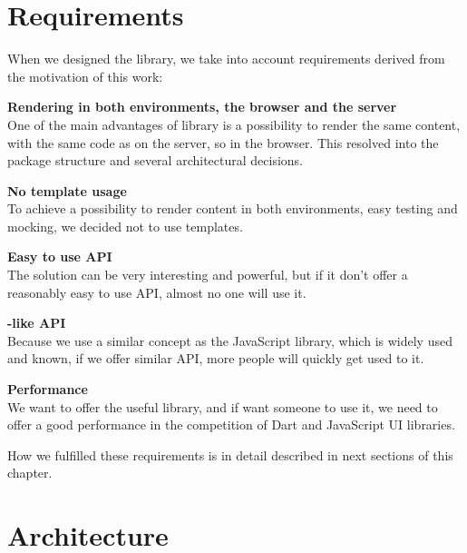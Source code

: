 \documentclass[oneside, 12pt]{book}
\begin{document}
\section{Requirements}\label{subsec:our-architecture-requirements}

  When we designed the \tiles library, we take into account requirements derived from the motivation of this work:

  \begin{description}
    \item{\textbf{Rendering in both environments, the browser and the server}} \hfill \\
      One of the main advantages of \tiles library is a possibility to render the same content, 
      with the same code as on the server, so in the browser.
      This resolved into the package structure and several architectural decisions.
      \begin{description}
        \item{\textbf{No template usage}} \hfill \\
          To achieve a possibility to render content in both environments, easy testing and mocking, 
          we decided not to use templates.
      \end{description}
    \item{\textbf{Easy to use API}} \hfill \\
      The solution can be very interesting and powerful, 
      but if it don't offer a reasonably easy to use API, almost no one will use it.
      \begin{description}
        \item{\textbf{\react-like API}} \hfill \\
          Because we use a similar concept as the JavaScript \react library,  
          which is widely used and known, 
          if we offer similar API, more people will quickly get used to it.
      \end{description}
    \item{\textbf{Performance}} \hfill \\
      We want to offer the useful library, and if want someone to use it, 
      we need to offer a good performance in the competition of Dart and JavaScript UI libraries.
  \end{description}

  How we fulfilled these requirements is in detail described in next sections of this chapter.

\section{Architecture}\label{sec:our-architecture}
\end{document}
